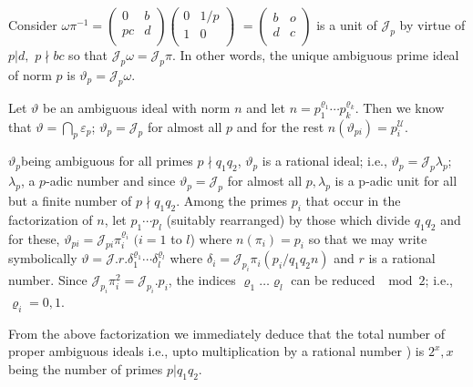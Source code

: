 Consider $ \omega \pi^{-1} =  \begin{pmatrix} 0 & b \\ pc & d
  \\ \end{pmatrix} \begin{pmatrix} 0 & 1/p \\ 1 & 0 \\ \end{pmatrix} $
$ = \begin{pmatrix} b & o \\ d & c \\ \end{pmatrix} $ is a unit of $
\mathcal{J} _p $ by virtue of $ p | d, $ $ p \nmid bc $ so that $
\mathcal{J}_p \omega =\mathcal{J}_p \pi$. In other words, the unique
ambiguous prime ideal 
of norm $p$ is  $ \vartheta_p = \mathcal{J}_p \omega $. 

\begin{note}
  Let $ \vartheta $ be an ambiguous ideal with norm $n$ and let  $ n =
  p_1^{\varrho_1} \cdots p_k ^{\varrho_k} $. Then we know that $
  \vartheta  = \bigcap \limits_{p} \varepsilon_p $; $
  \vartheta_p = \mathcal{J}_p $ for almost all $p$ and for the rest  $
  n ( \vartheta_{pi} ) = p_i^{\mathscr{U}} $. 
\end{note}

 $ \vartheta_p$\pageoriginale being ambiguous for all primes $ p \nmid
q_1 q_2 $, 
$ \vartheta_p $ is a rational ideal;  i.e., $\vartheta_p =
\mathcal{J}_p \lambda_p $; $ \lambda_p $, a $p$-adic number and since
$ \vartheta_p = \mathcal{J}_p $ for almost all $ p, \lambda_p $ is a
p-adic unit for all but a finite number of  $ p \nmid q_1 q_2 $. Among
the primes $p_i$ that occur in the factorization of $ n$, let $ p_1
\cdots p_l $ (suitably rearranged) by those which divide  $ q_1 q_2 $
and for these, $ \vartheta_{pi} = \mathcal{J}_{pi} \pi_i^{\varrho_i}$ $ (
i = 1 $ to $l$)  where $ n ( \pi_i ) = p_i $ so that we may write
symbolically $ \vartheta = \mathcal{J}. r. \delta_1^{\varrho_1} \cdots
\delta_l^{\varrho_l} $ where $ \delta_i = \mathcal{J}_{p_i} \pi_i (p_i/
q_1 q_2 n) $ and  $r$  is a rational number. Since $
\mathcal{J}_{p_{i}} \pi^2_i = \mathcal{J}_{p_{i}}. p_i $, the indices
$ \varrho_1 \ldots \varrho_l$ can be reduced $\mod 2$;  i.e., $
\varrho_i = 0, 1 $. 
 
 From the above factorization we immediately deduce that the total
 number of proper ambiguous ideals i.e., upto multiplication by a
 rational number ) is $ 2^x,  x $ being the number of primes $ p |
 q_1 q_2 $. 
 
